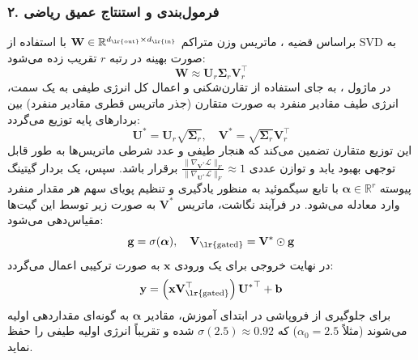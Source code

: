 \subsubsection*{۲. فرمول‌بندی و استنتاج عمیق ریاضی }
براساس قضیه ، ماتریس وزن متراکم $\mathbf{W} \in \mathbb{R}^{d_{\text{\lr{out}}} \times d_{\text{\lr{in}}}}$ با استفاده از SVD به صورت بهینه در رتبه $r$ تقریب زده می‌شود:
\begin{equation}
\mathbf{W} \approx \mathbf{U}_r \boldsymbol{\Sigma}_r \mathbf{V}_r^\top
\end{equation}
در ماژول ، به جای استفاده از تقارن‌شکنی و اعمال کل انرژی طیفی به یک سمت، انرژی طیف مقادیر منفرد به صورت متقارن (جذر ماتریس قطری مقادیر منفرد) بین بردارهای پایه توزیع می‌گردد:
\begin{equation}
\mathbf{U}^* = \mathbf{U}_r \sqrt{\boldsymbol{\Sigma}_r}, \quad \mathbf{V}^* = \sqrt{\boldsymbol{\Sigma}_r} \mathbf{V}_r^\top
\end{equation}
این توزیع متقارن تضمین می‌کند که هنجار طیفی  و عدد شرطی  ماتریس‌ها به طور قابل توجهی بهبود یابد و توازن عددی $\frac{\|\nabla_{\mathbf{V}^*} \mathcal{L}\|_F}{\|\nabla_{\mathbf{U}^*} \mathcal{L}\|_F} \approx 1$ برقرار باشد.
سپس، یک بردار گیتینگ پیوسته $\boldsymbol{\alpha} \in \mathbb{R}^r$ با تابع سیگموئید به منظور یادگیری و تنظیم پویای سهم هر مقدار منفرد وارد معادله می‌شود. در فرآیند نگاشت، ماتریس $\mathbf{V}^*$ به صورت زیر توسط این گیت‌ها مقیاس‌دهی می‌شود:
\begin{equation}
\mathbf{g} = \sigma(\boldsymbol{\alpha}), \quad \mathbf{V}_{\text{\lr{gated}}} = \mathbf{V}^* \odot \mathbf{g}
\end{equation}
در نهایت خروجی برای یک ورودی $\mathbf{x}$ به صورت ترکیبی اعمال می‌گردد:
\begin{equation}
\mathbf{y} = \left(\mathbf{x} \mathbf{V}_{\text{\lr{gated}}}^\top\right) {\mathbf{U}^*}^\top + \mathbf{b}
\end{equation}
برای جلوگیری از فروپاشی در ابتدای آموزش، مقادیر $\boldsymbol{\alpha}$ به گونه‌ای مقداردهی اولیه می‌شوند (مثلاً $\alpha_0 = 2.5$) که $\sigma(2.5) \approx 0.92$ شده و تقریباً انرژی اولیه طیفی را حفظ نماید.


